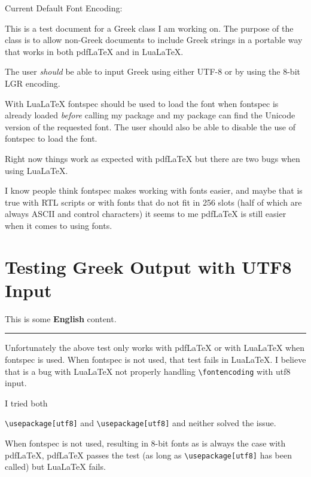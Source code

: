 \documentclass[letterpaper, fontsize=14pt]{scrartcl}
\begin{document}
\raggedright

Current Default Font Encoding: \encodingdefault

This is a test document for a Greek class I am working on. The purpose of the class is to allow non-Greek documents to include Greek strings in a portable way that works in both pdf\LaTeX{} and in Lua\LaTeX{}.

The user \emph{should} be able to input Greek using either UTF-8 or by using the 8-bit LGR encoding.

With Lua\LaTeX{} fontspec should be used to load the font when fontspec is already loaded \emph{before} calling my package and my package can find the Unicode version of the requested font. The user should also be able to disable the use of fontspec to load the font.

Right now things work as expected with pdf\LaTeX{} but there are two bugs when using Lua\LaTeX{}.

I know people think fontspec makes working with fonts easier, and maybe that is true with RTL scripts or with fonts that do not fit in 256 slots (half of which are always ASCII and control characters) it seems to me pdf\LaTeX{} is still easier when it comes to using fonts.

\section{Testing Greek Output with UTF8 Input}

This is some \textbf{English} content.


\rule{4cm}{0.4pt}

Unfortunately the above test only works with pdf\LaTeX{} or with Lua\LaTeX{} when fontspec is used. When fontspec is not used, that test fails in Lua\LaTeX{}. I believe that is a bug with Lua\LaTeX{} not properly handling\linebreak
\texttt{\textbackslash fontencoding} with utf8 input.

I tried both

\texttt{\textbackslash usepackage[utf8]} and\linebreak
\texttt{\textbackslash usepackage[utf8]} and neither solved the issue.

When fontspec is not used, resulting in 8-bit fonts as is always the case with pdf\LaTeX{}, pdf\LaTeX{} passes the test (as long as\linebreak
\texttt{\textbackslash usepackage[utf8]} has been called) but Lua\LaTeX{} fails.
\end{document}
